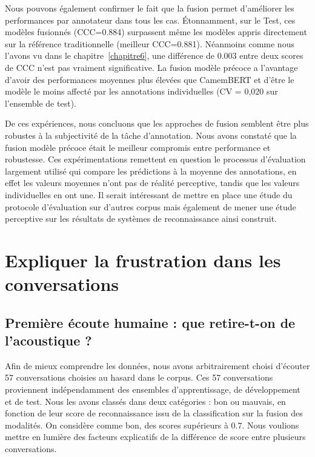 Nous pouvons également confirmer le fait que la fusion permet d'améliorer les performances par annotateur dans tous les cas.
Étonnamment, sur le Test, ces modèles fusionnés (CCC=0.884) surpassent même les modèles appris directement sur la référence traditionnelle (meilleur CCC=0.881). Néanmoins comme nous l'avons vu dans le chapitre~\ref{chapitre6}, une différence de 0.003 entre deux scores de CCC n'est pas vraiment significative.
La fusion modèle précoce a l'avantage d'avoir des performances moyennes plus élevées que CamemBERT et d'être le modèle le moins affecté par les annotations individuelles (CV = 0,020 sur l'ensemble de test).

De ces expériences, nous concluons que les approches de fusion semblent être plus robustes à la subjectivité de la tâche d'annotation. Nous avons constaté que la fusion modèle précoce était le meilleur compromis entre performance et robustesse.
Ces expérimentations remettent en question le processus d'évaluation largement utilisé qui compare les prédictions à la moyenne des annotations, en effet les valeurs moyennes n'ont pas de réalité perceptive, tandis que les valeurs individuelles en ont une. Il serait intéressant de mettre en place une étude du protocole d'évaluation sur d'autres corpus mais également de mener une étude perceptive sur les résultats de systèmes de reconnaissance ainsi construit.


\section{Expliquer la frustration dans les conversations}

\subsection{Première écoute humaine : que retire-t-on de l'acoustique ?}
Afin de mieux comprendre les données, nous avons arbitrairement choisi d'écouter 57 conversations choisies au hasard dans le corpus. Ces 57 conversations proviennent indépendamment des ensembles d'apprentissage, de développement et de test. Nous les avons classés dans deux catégories : bon ou mauvais, en fonction de leur score de reconnaissance issu de la classification sur la fusion des modalités. On considère comme bon, des scores supérieurs à $0.7$. Nous voulions mettre en lumière des facteurs explicatifs de la différence de score entre plusieurs conversations.



